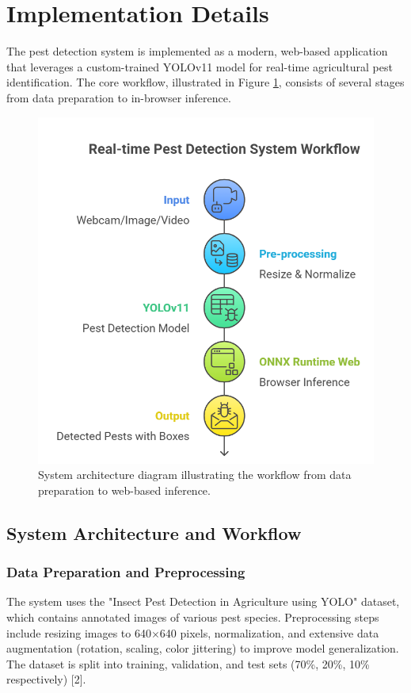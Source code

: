 \section{Implementation Details}
\label{sec:implementation_details}

The pest detection system is implemented as a modern, web-based application that leverages a custom-trained YOLOv11 model for real-time agricultural pest identification. The core workflow, illustrated in Figure \ref{fig:architecture}, consists of several stages from data preparation to in-browser inference.

\begin{figure}[H]
    \centering
    \includegraphics[width=0.8\columnwidth]{../images/architecture.png}
    \caption{System architecture diagram illustrating the workflow from data preparation to web-based inference.}
    \label{fig:architecture}
\end{figure}

\subsection{System Architecture and Workflow}

\subsubsection{Data Preparation and Preprocessing}
The system uses the "Insect Pest Detection in Agriculture using YOLO" dataset, which contains annotated images of various pest species. Preprocessing steps include resizing images to 640$\times$640 pixels, normalization, and extensive data augmentation (rotation, scaling, color jittering) to improve model generalization. The dataset is split into training, validation, and test sets (70\%, 20\%, 10\% respectively) [2].

